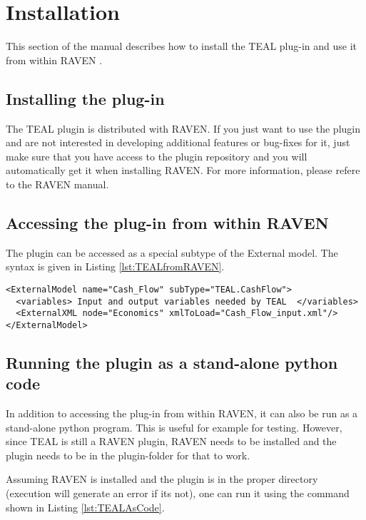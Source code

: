 
\section{Installation}
\label{sec:Installation}

This section of the manual describes how to install the TEAL plug-in and use it from within RAVEN \cite{RAVEN}.

\subsection{Installing the plug-in}
The TEAL plugin is distributed with RAVEN. If you just want to use the plugin and are not interested in developing additional features or bug-fixes for it, just make sure that you have access to the plugin repository and you will automatically get it when installing RAVEN.
For more information, please refere to the RAVEN manual.

\subsection{Accessing the plug-in from within RAVEN}
The plugin can be accessed as a special subtype of the External model. The syntax is given in Listing \ref{lst:TEALfromRAVEN}.

\begin{lstlisting}[style=XML,morekeywords={anAttribute},caption=Call TEAL.CashFlow from RAVEN input., label=lst:TEALfromRAVEN]
<ExternalModel name="Cash_Flow" subType="TEAL.CashFlow">
  <variables> Input and output variables needed by TEAL  </variables>
  <ExternalXML node="Economics" xmlToLoad="Cash_Flow_input.xml"/>
</ExternalModel>
\end{lstlisting}

\subsection{Running the plugin as a stand-alone python code}

In addition to accessing the plug-in from within RAVEN, it can also be run as a stand-alone python program. This is useful for example for testing. However, since TEAL is still a RAVEN plugin, RAVEN needs to be installed and the plugin needs to be in the plugin-folder for that to work.

Assuming RAVEN is installed and the plugin is in the proper directory (execution will generate an error if its not), one can run it using the command shown in Listing \ref{lst:TEALAsCode}.

